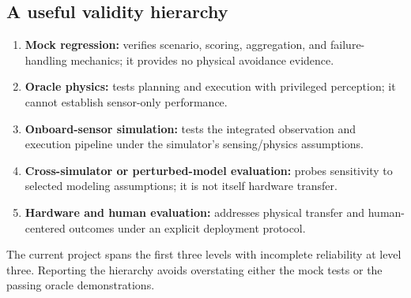 \documentclass[11pt,a4paper]{article}
\begin{document}
\subsection{A useful validity hierarchy}
\begin{enumerate}
\item \textbf{Mock regression:} verifies scenario, scoring, aggregation, and
failure-handling mechanics; it provides no physical avoidance evidence.
\item \textbf{Oracle physics:} tests planning and execution with privileged
perception; it cannot establish sensor-only performance.
\item \textbf{Onboard-sensor simulation:} tests the integrated observation and
execution pipeline under the simulator's sensing/physics assumptions.
\item \textbf{Cross-simulator or perturbed-model evaluation:} probes sensitivity
to selected modeling assumptions; it is not itself hardware transfer.
\item \textbf{Hardware and human evaluation:} addresses physical transfer and
human-centered outcomes under an explicit deployment protocol.
\end{enumerate}
The current project spans the first three levels with incomplete reliability
at level three. Reporting the hierarchy avoids overstating either the mock
tests or the passing oracle demonstrations.


\end{document}
